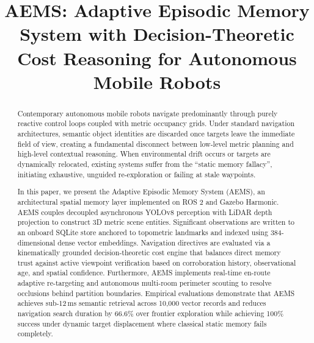 \documentclass[conference]{IEEEtran}
\begin{document}
\title{AEMS: Adaptive Episodic Memory System with Decision-Theoretic Cost Reasoning for Autonomous Mobile Robots}

\author{
}

\maketitle

\begin{abstract}
Contemporary autonomous mobile robots navigate predominantly through purely reactive control loops coupled with metric occupancy grids. Under standard navigation architectures, semantic object identities are discarded once targets leave the immediate field of view, creating a fundamental disconnect between low-level metric planning and high-level contextual reasoning. When environmental drift occurs or targets are dynamically relocated, existing systems suffer from the ``static memory fallacy'', initiating exhaustive, unguided re-exploration or failing at stale waypoints. 

In this paper, we present the Adaptive Episodic Memory System (AEMS), an architectural spatial memory layer implemented on ROS 2 and Gazebo Harmonic. AEMS couples decoupled asynchronous YOLOv8 perception with LiDAR depth projection to construct 3D metric scene entities. Significant observations are written to an onboard SQLite store anchored to topometric landmarks and indexed using 384-dimensional dense vector embeddings. Navigation directives are evaluated via a kinematically grounded decision-theoretic cost engine that balances direct memory trust against active viewpoint verification based on corroboration history, observational age, and spatial confidence. Furthermore, AEMS implements real-time en-route adaptive re-targeting and autonomous multi-room perimeter scouting to resolve occlusions behind partition boundaries. Empirical evaluations demonstrate that AEMS achieves sub-12\,ms semantic retrieval across 10,000 vector records and reduces navigation search duration by 66.6\% over frontier exploration while achieving 100\% success under dynamic target displacement where classical static memory fails completely.
\end{abstract}
\end{document}
